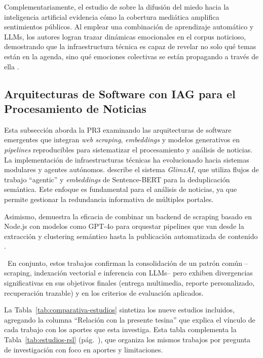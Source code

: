 \documentclass[12pt]{report}
\begin{document}
Complementariamente, el estudio de \citet{samuel2025} sobre la difusión del miedo hacia la inteligencia artificial evidencia cómo la cobertura mediática amplifica sentimientos públicos. Al emplear una combinación de aprendizaje automático y LLMs, los autores logran trazar dinámicas emocionales en el corpus noticioso, demostrando que la infraestructura técnica es capaz de revelar no solo qué temas están en la agenda, sino qué emociones colectivas se están propagando a través de ella \citep{samuel2025}.

\subsection{Arquitecturas de Software con IAG para el Procesamiento de Noticias}
\label{sec:rsl-arquitecturas}
Esta subsección aborda la PR3 examinando las arquitecturas de software emergentes que integran \textit{web scraping}, \textit{embeddings} y modelos generativos en \textit{pipelines} reproducibles para sistematizar el procesamiento y análisis de noticias. La implementación de infraestructuras técnicas ha evolucionado hacia sistemas modulares y agentes autónomos. \citet{behbahanian} describe el sistema \textit{GlimzAI}, que utiliza flujos de trabajo ``agentic'' y \textit{embeddings} de Sentence-BERT para la deduplicación semántica. Este enfoque es fundamental para el análisis de noticias, ya que permite gestionar la redundancia informativa de múltiples portales.

Asimismo, \citet{neupane2025} demuestra la eficacia de combinar un backend de scraping basado en Node.js con modelos como GPT-4o para orquestar pipelines que van desde la extracción y clustering semántico hasta la publicación automatizada de contenido \citep{neupane2025}.

\ En conjunto, estos trabajos confirman la consolidación de un patrón común --scraping, indexación vectorial e inferencia con LLMs-- pero exhiben divergencias significativas en sus objetivos finales (entrega multimedia, reporte personalizado, recuperación trazable) y en los criterios de evaluación aplicados.

La Tabla~\ref{tab:comparativa-estudios} sintetiza los nueve estudios incluidos, agregando la columna ``Relación con la presente tesina'' que explica el vínculo de cada trabajo con los aportes que esta investiga. Esta tabla complementa la Tabla~\ref{tab:estudios-rsl} (pág.~\pageref{tab:estudios-rsl}), que organiza los mismos trabajos por pregunta de investigación con foco en aportes y limitaciones.
\end{document}
